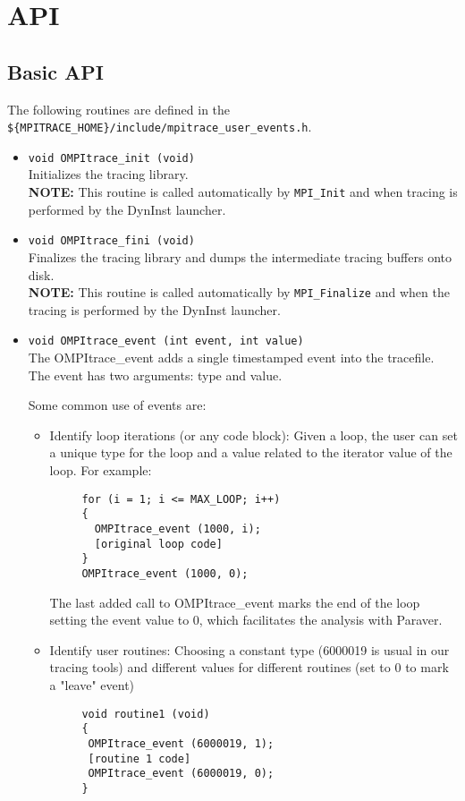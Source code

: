 \chapter{\TRACE API}\label{cha:API}

\section{Basic API}\label{sec:BasicAPI}

The following routines are defined in the {\tt \$\{MPITRACE\_HOME\}/include/mpitrace\_user\_events.h}.

\begin{itemize}

 \item {\tt void OMPItrace\_init (void)}\\
 Initializes the tracing library.\\
 {\bf NOTE:} This routine is called automatically by {\tt MPI\_Init} and when tracing is performed by the DynInst launcher.

 \item {\tt void OMPItrace\_fini (void)}\\
 Finalizes the tracing library and dumps the intermediate tracing buffers onto disk.\\
 {\bf NOTE:} This routine is called automatically by {\tt MPI\_Finalize} and when the tracing is performed by the DynInst launcher.

 \item {\tt void OMPItrace\_event (int event, int value)}\\
 The OMPItrace\_event adds a single timestamped event into the tracefile. The event has two arguments: type and value.

 Some common use of events are:
  \begin{itemize}
   \item Identify loop iterations (or any code block): Given a loop, the user can set a unique type for the loop and a value related to the iterator value of the loop. For example:
    \begin{verbatim}
     for (i = 1; i <= MAX_LOOP; i++)
     {
       OMPItrace_event (1000, i);
       [original loop code]
     }
     OMPItrace_event (1000, 0);
    \end{verbatim}
   The last added call to OMPItrace\_event marks the end of the loop setting the event value to 0, which facilitates the analysis with Paraver.
   \item Identify user routines: Choosing a constant type (6000019 is usual in our tracing tools) and different values for different routines (set to 0 to mark a "leave" event) 
    \begin{verbatim}
     void routine1 (void)
     {
      OMPItrace_event (6000019, 1);
      [routine 1 code]
      OMPItrace_event (6000019, 0);
     }


\end{verbatim}
\end{itemize}
\end{itemize}
